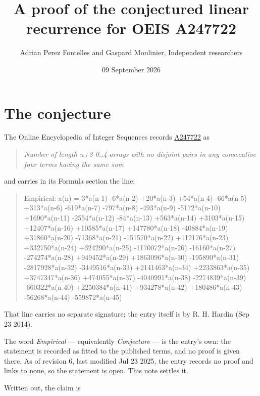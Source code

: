 \documentclass[11pt]{article}
\title{A proof of the conjectured linear recurrence for OEIS A247722}
\author{Adrian Perez Fontelles and Gaspard Moulinier, Independent researchers}
\date{09 September 2026}
\theoremstyle{definition}
\begin{document}
\maketitle
\section{The conjecture}

The Online Encyclopedia of Integer Sequences records \href{https://oeis.org/A247722}{A247722} as

\begin{quote}\itshape Number of length n+3 0..4 arrays with no disjoint pairs in any consecutive four terms having the same sum\end{quote}

and carries in its Formula section the line:

\begin{quote}\ttfamily Empirical: a(n) = 3*a(n-1) -6*a(n-2) +20*a(n-3) +54*a(n-4) -66*a(n-5) +313*a(n-6) -619*a(n-7) -797*a(n-8) -493*a(n-9) -5172*a(n-10) +1690*a(n-11) -2554*a(n-12) -84*a(n-13) +563*a(n-14) +3103*a(n-15) +12407*a(n-16) +10585*a(n-17) +147780*a(n-18) -40884*a(n-19) +31860*a(n-20) -71368*a(n-21) -151570*a(n-22) +112176*a(n-23) +332750*a(n-24) +324290*a(n-25) -1170072*a(n-26) -16160*a(n-27) -274274*a(n-28) +949452*a(n-29) +1863096*a(n-30) -195890*a(n-31) -2817928*a(n-32) -3449516*a(n-33) +2141463*a(n-34) +2233863*a(n-35) +3747347*a(n-36) +474055*a(n-37) -4040991*a(n-38) -2274839*a(n-39) -660322*a(n-40) +2250384*a(n-41) +934278*a(n-42) +180486*a(n-43) -56268*a(n-44) -559872*a(n-45)\end{quote}

That line carries no separate signature; the entry itself is by R. H. Hardin (Sep 23 2014).

The word {\itshape Empirical} --- equivalently {\itshape Conjecture} --- is the entry's own: the statement is recorded as fitted to the published terms, and no proof is given there. As of revision 6, last modified Jul 23 2025, the entry records no proof and links to none, so the statement is open. This note settles it.

Written out, the claim is
\end{document}
